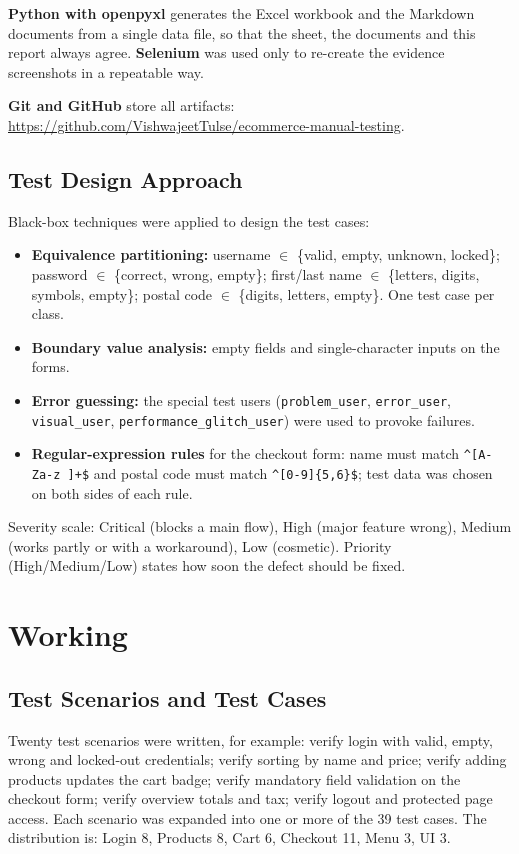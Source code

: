 \documentclass[12pt,a4paper]{article}
\begin{document}
\textbf{Python with openpyxl} generates the Excel workbook and the Markdown documents from a single data file, so that the sheet, the documents and this report always agree. \textbf{Selenium} was used only to re-create the evidence screenshots in a repeatable way.

\textbf{Git and GitHub} store all artifacts: \url{https://github.com/VishwajeetTulse/ecommerce-manual-testing}.

\subsection{Test Design Approach}\label{sec:impl2}
Black-box techniques were applied to design the test cases:
\begin{itemize}[nosep]
  \item \textbf{Equivalence partitioning:} username $\in$ \{valid, empty, unknown, locked\}; password $\in$ \{correct, wrong, empty\}; first/last name $\in$ \{letters, digits, symbols, empty\}; postal code $\in$ \{digits, letters, empty\}. One test case per class.
  \item \textbf{Boundary value analysis:} empty fields and single-character inputs on the forms.
  \item \textbf{Error guessing:} the special test users (\texttt{problem\_user}, \texttt{error\_user}, \texttt{visual\_user}, \texttt{performance\_glitch\_user}) were used to provoke failures.
  \item \textbf{Regular-expression rules} for the checkout form: name must match \texttt{\^{}[A-Za-z ]+\$} and postal code must match \texttt{\^{}[0-9]\{5,6\}\$}; test data was chosen on both sides of each rule.
\end{itemize}
Severity scale: Critical (blocks a main flow), High (major feature wrong), Medium (works partly or with a workaround), Low (cosmetic). Priority (High/Medium/Low) states how soon the defect should be fixed.

\section{Working}\label{sec:work}
\subsection{Test Scenarios and Test Cases}\label{sec:work1}
Twenty test scenarios were written, for example: verify login with valid, empty, wrong and locked-out credentials; verify sorting by name and price; verify adding products updates the cart badge; verify mandatory field validation on the checkout form; verify overview totals and tax; verify logout and protected page access. Each scenario was expanded into one or more of the 39 test cases. The distribution is: Login 8, Products 8, Cart 6, Checkout 11, Menu 3, UI 3.
\end{document}
